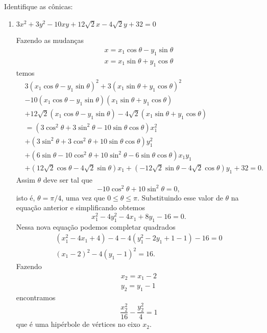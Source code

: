 \begin{exemplos}
  Identifique as c\^onicas:
  \begin{enumerate}
    \item $3x^2 + 3y^2 - 10xy + 12\sqrt{2}x - 4\sqrt{2}y + 32 = 0$
    \begin{solucao}
      Fazendo as mudan\c{c}as
      \begin{align}
        x = x_1\cos\theta - y_1\sin\theta\\
        x = x_1\sin\theta + y_1\cos\theta
      \end{align}
      temos
      \begin{align*}
        &3(x_1\cos\theta - y_1\sin\theta)^2 + 3(x_1\sin\theta + y_1\cos\theta)^2\\ &- 10(x_1\cos\theta - y_1\sin\theta)(x_1\sin\theta + y_1\cos\theta)\\ & + 12\sqrt{2}(x_1\cos\theta - y_1\sin\theta) - 4\sqrt{2}(x_1\sin\theta + y_1\cos\theta)\\ &= (3\cos^2\theta + 3\sin^2\theta - 10\sin\theta\cos\theta)x_1^2 \\ &+ (3\sin^2\theta + 3\cos^2\theta + 10\sin\theta\cos\theta)y_1^2 \\ &+ (6\sin\theta - 10\cos^2\theta + 10\sin^2\theta - 6\sin\theta\cos\theta)x_1y_1 \\ &+ (12\sqrt{2}\cos\theta - 4\sqrt{2}\sin\theta)x_1 + (-12\sqrt{2}\sin\theta - 4\sqrt{2}\cos\theta)y_1 + 32 = 0.
      \end{align*}
      Assim $\theta$ deve ser tal que
      \[
        -10\cos^2\theta + 10\sin^2\theta = 0,
      \]
      isto \'e, $\theta = \pi/4$, uma vez que $0 \le \theta \le \pi$. Substituindo esse valor de $\theta$ na equa\c{c}\~ao anterior e simplificando obtemos
      \[
        x_1^2 - 4y_1^2 - 4x_1 + 8y_1 - 16 = 0.
      \]
      Nessa nova equa\c{c}\~ao podemos completar quadrados
      \begin{align*}
        (x_1^2 - 4x_1 + 4) - 4 - 4(y_1^2 - 2y_1 + 1 - 1) - 16 = 0\\
        (x_1 - 2)^2 - 4(y_1 - 1)^2 = 16.
      \end{align*}
      Fazendo
      \begin{align*}
        x_2 = x_1 - 2\\
        y_2 = y_1 - 1
      \end{align*}
      encontramos
      \[
        \dfrac{x_2^2}{16} - \dfrac{y_2^2}{4} = 1
      \]
      que \'e uma hip\'erbole de v\'ertices no eixo $x_2$.
      \begin{figure}[!h]

\end{figure}
\end{solucao}
\end{enumerate}
\end{exemplos}
